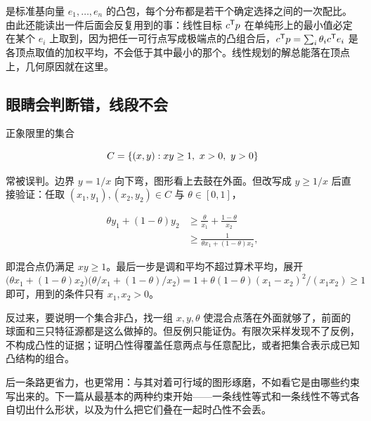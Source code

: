 是标准基向量 \(e_1,\dots,e_n\) 的凸包，每个分布都是若干个确定选择之间的一次配比。由此还能读出一件后面会反复用到的事：线性目标 \(c^{\mathsf{T}}p\) 在单纯形上的最小值必定在某个 \(e_i\) 上取到，因为把任一可行点写成极端点的凸组合后，\(c^{\mathsf{T}}p=\sum_i\theta_i c^{\mathsf{T}}e_i\) 是各顶点取值的加权平均，不会低于其中最小的那个。线性规划的解总能落在顶点上，几何原因就在这里。

\subsection{眼睛会判断错，线段不会}

正象限里的集合

\[
C=\set{(x,y):xy\ge1,\ x>0,\ y>0}
\]

常被误判。边界 \(y=1/x\) 向下弯，图形看上去鼓在外面。但改写成 \(y\ge1/x\) 后直接验证：任取 \((x_1,y_1),(x_2,y_2)\in C\) 与 \(\theta\in[0,1]\)，

\[
\begin{aligned}
\theta y_1+(1-\theta)y_2
&\ge\frac{\theta}{x_1}+\frac{1-\theta}{x_2}\\
&\ge\frac{1}{\theta x_1+(1-\theta)x_2},
\end{aligned}
\]

即混合点仍满足 \(xy\ge1\)。最后一步是调和平均不超过算术平均，展开 \(\bigl(\theta x_1+(1-\theta)x_2\bigr)\bigl(\theta/x_1+(1-\theta)/x_2\bigr)=1+\theta(1-\theta)(x_1-x_2)^2/(x_1x_2)\ge1\) 即可，用到的条件只有 \(x_1,x_2>0\)。

反过来，要说明一个集合非凸，找一组 \(x,y,\theta\) 使混合点落在外面就够了，前面的球面和三只特征源都是这么做掉的。但反例只能证伪。有限次采样发现不了反例，不构成凸性的证据；证明凸性得覆盖任意两点与任意配比，或者把集合表示成已知凸结构的组合。

后一条路更省力，也更常用：与其对着可行域的图形琢磨，不如看它是由哪些约束写出来的。下一篇从最基本的两种约束开始——一条线性等式和一条线性不等式各自切出什么形状，以及为什么把它们叠在一起时凸性不会丢。
